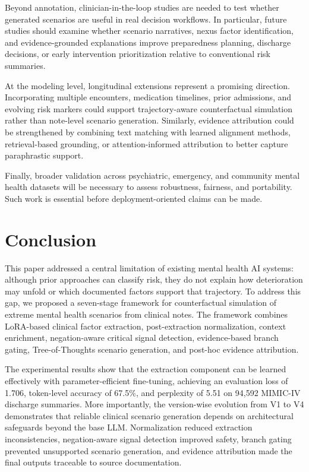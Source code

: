 \documentclass[conference]{IEEEtran}
\begin{document}
Beyond annotation, clinician-in-the-loop studies are needed to test whether generated scenarios are useful in real decision workflows. In particular, future studies should examine whether scenario narratives, nexus factor identification, and evidence-grounded explanations improve preparedness planning, discharge decisions, or early intervention prioritization relative to conventional risk summaries.

At the modeling level, longitudinal extensions represent a promising direction. Incorporating multiple encounters, medication timelines, prior admissions, and evolving risk markers could support trajectory-aware counterfactual simulation rather than note-level scenario generation. Similarly, evidence attribution could be strengthened by combining text matching with learned alignment methods, retrieval-based grounding, or attention-informed attribution to better capture paraphrastic support.

Finally, broader validation across psychiatric, emergency, and community mental health datasets will be necessary to assess robustness, fairness, and portability. Such work is essential before deployment-oriented claims can be made.

\section{Conclusion}

This paper addressed a central limitation of existing mental health AI systems: although prior approaches can classify risk, they do not explain how deterioration may unfold or which documented factors support that trajectory. To address this gap, we proposed a seven-stage framework for counterfactual simulation of extreme mental health scenarios from clinical notes. The framework combines LoRA-based clinical factor extraction, post-extraction normalization, context enrichment, negation-aware critical signal detection, evidence-based branch gating, Tree-of-Thoughts scenario generation, and post-hoc evidence attribution.

The experimental results show that the extraction component can be learned effectively with parameter-efficient fine-tuning, achieving an evaluation loss of 1.706, token-level accuracy of 67.5\%, and perplexity of 5.51 on 94,592 MIMIC-IV discharge summaries. More importantly, the version-wise evolution from V1 to V4 demonstrates that reliable clinical scenario generation depends on architectural safeguards beyond the base LLM. Normalization reduced extraction inconsistencies, negation-aware signal detection improved safety, branch gating prevented unsupported scenario generation, and evidence attribution made the final outputs traceable to source documentation.
\end{document}
